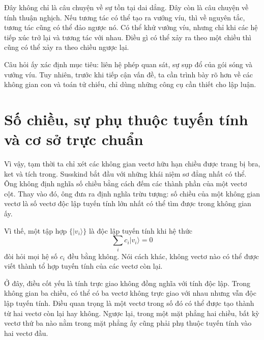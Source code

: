 Đây không chỉ là câu chuyện về sự tồn tại dai dẳng. Đây còn là câu chuyện về tính thuận nghịch. Nếu tương tác có thể tạo ra vướng víu, thì về nguyên tắc, tương tác cũng có thể đảo ngược nó. Có thể khử vướng víu, nhưng chỉ khi các hệ tiếp xúc trở lại và tương tác với nhau. Điều gì có thể xảy ra theo một chiều thì cũng có thể xảy ra theo chiều ngược lại.

\begin{classroomqa}
\end{classroomqa}

Câu hỏi ấy xác định mục tiêu: liên hệ phép quan sát, sự sụp đổ của gói sóng và vướng víu. Tuy nhiên, trước khi tiếp cận vấn đề, ta cần trình bày rõ hơn về các không gian con và toán tử chiếu, chỉ dùng những công cụ cần thiết cho lập luận.

\section{Số chiều, sự phụ thuộc tuyến tính và cơ sở trực chuẩn}

Vì vậy, tạm thời ta chỉ xét các không gian vectơ hữu hạn chiều được trang bị bra, ket và tích trong. Susskind bắt đầu với những khái niệm sơ đẳng nhất có thể. Ông không định nghĩa số chiều bằng cách đếm các thành phần của một vectơ cột. Thay vào đó, ông đưa ra định nghĩa trừu tượng: số chiều của một không gian vectơ là số vectơ độc lập tuyến tính lớn nhất có thể tìm được trong không gian ấy.

Vì thế, một tập hợp \(\{|v_i\rangle\}\) là độc lập tuyến tính khi hệ thức
\begin{equation}
\sum_i c_i |v_i\rangle = 0
\end{equation}
đòi hỏi mọi hệ số \(c_i\) đều bằng không. Nói cách khác, không vectơ nào có thể được viết thành tổ hợp tuyến tính của các vectơ còn lại.

Ở đây, điều cốt yếu là tính trực giao không đồng nghĩa với tính độc lập. Trong không gian ba chiều, có thể có ba vectơ không trực giao với nhau nhưng vẫn độc lập tuyến tính. Điều quan trọng là một vectơ trong số đó có thể được tạo thành từ hai vectơ còn lại hay không. Ngược lại, trong một mặt phẳng hai chiều, bất kỳ vectơ thứ ba nào nằm trong mặt phẳng ấy cũng phải phụ thuộc tuyến tính vào hai vectơ đầu.

